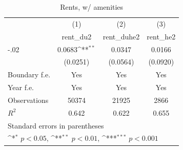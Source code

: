 \begin{table}[htbp]\centering
\def\sym#1{\ifmmode^{#1}\else\(^{#1}\)\fi}
\caption{Rents, w/ amenities}
\begin{tabular}{l*{3}{c}}
\hline\hline
                    &\multicolumn{1}{c}{(1)}&\multicolumn{1}{c}{(2)}&\multicolumn{1}{c}{(3)}\\
                    &\multicolumn{1}{c}{rent\_du2}&\multicolumn{1}{c}{rent\_duhe2}&\multicolumn{1}{c}{rent\_he2}\\
\hline
-.02                &      0.0683\sym{**} &      0.0347         &      0.0166         \\
                    &    (0.0251)         &    (0.0564)         &    (0.0920)         \\
[1em]
Boundary f.e.       &         Yes         &         Yes         &         Yes         \\
[1em]
Year f.e.           &         Yes         &         Yes         &         Yes         \\
\hline
Observations        &       50374         &       21925         &        2866         \\
\(R^{2}\)           &       0.642         &       0.622         &       0.655         \\
\hline\hline
\multicolumn{4}{l}{\footnotesize Standard errors in parentheses}\\
\multicolumn{4}{l}{\footnotesize \sym{*} \(p<0.05\), \sym{**} \(p<0.01\), \sym{***} \(p<0.001\)}\\
\end{tabular}
\end{table}
